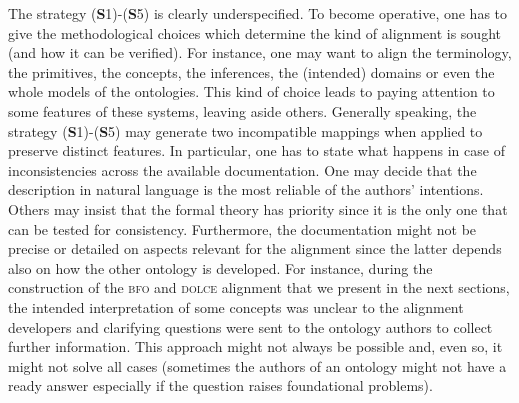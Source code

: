 \documentclass[ao]{iosart2x}
\newcommand{\dolce}{{\textsc{dolce}}}
\newcommand{\bfo}{{\textsc{bfo}}}
\begin{document}
The strategy ({\bf S}1)-({\bf S}5) is clearly underspecified. To become operative, one has to give the methodological choices which determine the kind of alignment is sought (and how it can be verified). For instance, one may want to align the terminology, the primitives, the concepts, the inferences, the (intended) domains or even the whole models of the ontologies. This kind of choice leads to paying attention to some features of these systems, leaving aside others. Generally speaking, the strategy ({\bf S}1)-({\bf S}5) may generate two incompatible mappings when applied to preserve distinct features.
In particular, one has to state what happens in case of inconsistencies across the available documentation. One may decide that the description in natural language is the most reliable of the authors' intentions. Others may insist that the formal theory has priority since it is the only one that can be tested for consistency. Furthermore, the documentation might not be precise or detailed on aspects relevant for the alignment since the latter depends also on how the other ontology is developed. For instance, during the construction of the {\bfo} and {\dolce} alignment that we present in the next sections, the intended interpretation of some concepts was unclear to the alignment developers and clarifying questions were sent to the ontology authors to collect further information. This approach might not always be possible and, even so, it might not solve all cases (sometimes the authors of an ontology might not have a ready answer especially if the question raises foundational problems). %
\end{document}
